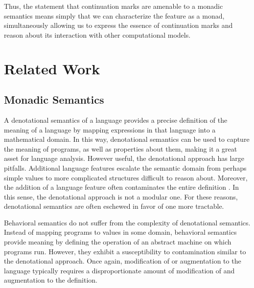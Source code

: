 \documentclass[ms]{byuprop}
\newcounter{definition}
\begin{document}

Thus, the statement that continuation marks are amenable to a monadic semantics means
simply that we can characterize the feature as a monad, simultaneously allowing us to express
the essence of continuation marks and reason about its interaction with other
computational models.


\section{Related Work}

\subsection{Monadic Semantics}

A denotational semantics of a language provides a precise definition of the meaning of a 
language by mapping expressions in that language into a mathematical domain. In this way,
denotational semantics can be used to capture the meaning of programs, as well as
properties about them, making it a great asset for language analysis. However useful, the
denotational approach has large pitfalls. Additional language features escalate the 
semantic domain from perhaps simple values to more complicated structures difficult to reason 
about. Moreover, the addition of a language feature often contaminates the entire definition 
\cite{liang2009modular}. In this sense, the denotational approach is not a modular one. For 
these reasons, denotational semantics are often eschewed in favor of one more tractable.

Behavioral semantics do not suffer from the complexity of denotational semantics. Instead of 
mapping programs to values in some domain, behavioral semantics provide meaning by defining 
the operation of an abstract machine on which programs run. However, they exhibit a 
susceptibility to contamination similar to the denotational approach. Once again, modification 
of or augmentation to the language typically requires a disproportionate amount of modification 
of and augmentation to the definition.
\end{document}
